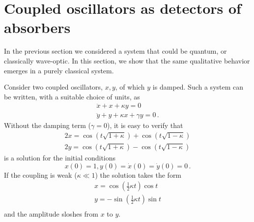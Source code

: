 \documentclass[prb,preprint]{revtex4-1}
\begin{document}
\section{Coupled oscillators as detectors of absorbers}\label{sec:oscill}

In the previous section we considered a system that could be quantum,
or classically wave-optic.  In this section, we show that the same
qualitative behavior emerges in a purely classical system.

Consider two coupled oscillators, $x,y$, of which $y$ is damped.  Such
a system can be written, with a suitable choice of units, as
\begin{equation}
\begin{array}{l}
\ddot x + x + \kappa y = 0 \\
\ddot y + y + \kappa x + \gamma y = 0 \,.
\label{eqn:coupled}
\end{array}
\end{equation}
Without the damping term ($\gamma=0$), it is easy to verify that
\begin{equation}
\begin{array}{l}
2x = \cos(t\sqrt{1+\kappa}) + \cos(t\sqrt{1-\kappa})  \\
2y = \cos(t\sqrt{1+\kappa}) - \cos(t\sqrt{1-\kappa})
\end{array}
\end{equation}
is a solution for the initial conditions
\begin{equation}
x(0) = 1, y(0) = \dot x(0) = \dot y(0) = 0 \,.
\label{eqn:inic}
\end{equation}
If the coupling is weak ($\kappa\ll1$) the solution takes the form
\begin{equation}
\begin{array}{l}
x = \cos\left(\frac12\kappa t\right) \cos t \\
y = -\sin\left(\frac12\kappa t\right) \sin t \\
\end{array}
\end{equation}
and the amplitude sloshes from $x$ to $y$.
\end{document}
